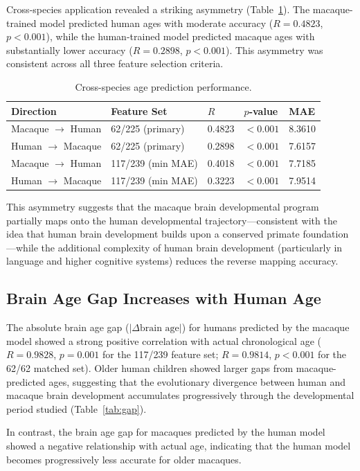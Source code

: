 \documentclass[12pt]{article}
\begin{document}
Cross-species application revealed a striking asymmetry (Table~\ref{tab:cross}). The macaque-trained model predicted human ages with moderate accuracy ($R = 0.4823$, $p < 0.001$), while the human-trained model predicted macaque ages with substantially lower accuracy ($R = 0.2898$, $p < 0.001$). This asymmetry was consistent across all three feature selection criteria.

\begin{table}[H]
\centering
\caption{Cross-species age prediction performance.}
\label{tab:cross}
\begin{tabular}{lllll}
\toprule
Direction & Feature Set & $R$ & $p$-value & MAE \\
\midrule
Macaque $\to$ Human & 62/225 (primary) & 0.4823 & $< 0.001$ & 8.3610 \\
Human $\to$ Macaque & 62/225 (primary) & 0.2898 & $< 0.001$ & 7.6157 \\
Macaque $\to$ Human & 117/239 (min MAE) & 0.4018 & $< 0.001$ & 7.7185 \\
Human $\to$ Macaque & 117/239 (min MAE) & 0.3223 & $< 0.001$ & 7.9514 \\
\bottomrule
\end{tabular}
\end{table}

This asymmetry suggests that the macaque brain developmental program partially maps onto the human developmental trajectory---consistent with the idea that human brain development builds upon a conserved primate foundation---while the additional complexity of human brain development (particularly in language and higher cognitive systems) reduces the reverse mapping accuracy.

\subsection{Brain Age Gap Increases with Human Age}

The absolute brain age gap ($|\Delta\text{brain age}|$) for humans predicted by the macaque model showed a strong positive correlation with actual chronological age ($R = 0.9828$, $p = 0.001$ for the 117/239 feature set; $R = 0.9814$, $p < 0.001$ for the 62/62 matched set). Older human children showed larger gaps from macaque-predicted ages, suggesting that the evolutionary divergence between human and macaque brain development accumulates progressively through the developmental period studied (Table~\ref{tab:gap}).

In contrast, the brain age gap for macaques predicted by the human model showed a negative relationship with actual age, indicating that the human model becomes progressively less accurate for older macaques.
\end{document}
